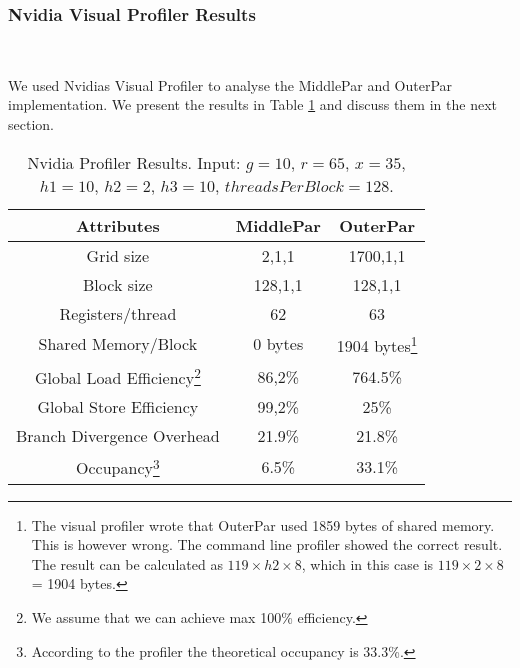 \subsubsection{Nvidia Visual Profiler Results} \hfill \\
\label{sec:profiler}

We used Nvidias Visual Profiler to analyse the MiddlePar and OuterPar implementation. We present the results in Table \ref{table:profiler} and discuss them in the next section.

\begin{savenotes}
\begin{table}  
\begin{center}
\begin{tabular}[t]{|c|c|c|}
	\hline
\textbf{Attributes} & \textbf{MiddlePar} & \textbf{OuterPar} \\\hline
Grid size  & 2,1,1 & 1700,1,1\\\hline
Block size & 128,1,1&128,1,1\\\hline
Registers/thread & 62&63\\\hline
Shared Memory/Block &0 bytes& 1904 bytes\footnote{The visual profiler wrote that OuterPar used 1859 bytes of shared memory. This is however wrong. The command line profiler showed the correct result. The result can be calculated as $119 \times h2 \times 8$, which in this case is $119 \times 2 \times8$ = 1904 bytes.}\\\hline
Global Load Efficiency\footnote{We assume that we can achieve max 100\% efficiency.}&86,2\%&764.5\%\\\hline
Global Store Efficiency&99,2\%&25\%\\\hline
Branch Divergence Overhead&21.9\%& 21.8\%\\\hline
Occupancy\footnote{According to the profiler the theoretical occupancy is 33.3\%.}&6.5\%&33.1\%\\\hline
\end{tabular}
\end{center}
\caption{Nvidia Profiler Results. Input: $g=10$, $r=65$, $x=35$, $h1=10$, $h2=2$, $h3=10$, $threadsPerBlock=128$.}
\label{table:profiler}
\end{table}
\end{savenotes}


